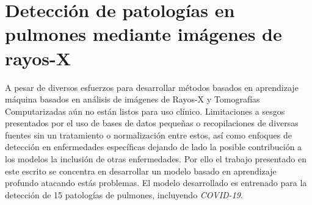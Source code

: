 \section{Detección de patologías en pulmones mediante imágenes de rayos-X}

A pesar de diversos esfuerzos para desarrollar métodos basados en aprendizaje máquina basados en
análisis de imágenes de Rayos-X y Tomografías Computarizadas aún no están listos para uso clínico.
Limitaciones a sesgos presentados por el uso de bases de datos pequeñas o recopilaciones de diversas fuentes sin
un tratamiento o normalización entre estos, así como enfoques de detección en enfermedades
específicas dejando de lado la posible contribución a los modelos la inclusión de otras enfermedades.
Por ello el trabajo presentado en este escrito se concentra en desarrollar un modelo basado en
aprendizaje profundo atacando estás problemas. El modelo desarrollado es entrenado para la detección
de 15 patologías de pulmones, incluyendo \textit{COVID-19}.


